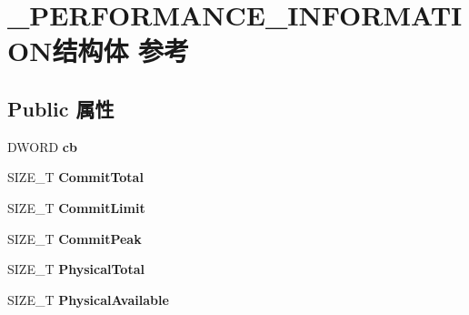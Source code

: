 \hypertarget{struct___p_e_r_f_o_r_m_a_n_c_e___i_n_f_o_r_m_a_t_i_o_n}{}\section{\+\_\+\+P\+E\+R\+F\+O\+R\+M\+A\+N\+C\+E\+\_\+\+I\+N\+F\+O\+R\+M\+A\+T\+I\+O\+N结构体 参考}
\label{struct___p_e_r_f_o_r_m_a_n_c_e___i_n_f_o_r_m_a_t_i_o_n}
\subsection*{Public 属性}
\begin{DoxyCompactItemize}
\item 
\mbox{\label{struct___p_e_r_f_o_r_m_a_n_c_e___i_n_f_o_r_m_a_t_i_o_n_a6cc44ea0397d9eefedb0f02ac1a9c631}} 
D\+W\+O\+RD {\bfseries cb}
\item 
\mbox{\label{struct___p_e_r_f_o_r_m_a_n_c_e___i_n_f_o_r_m_a_t_i_o_n_ad7b374092f82f4dd64cbbbabeb53b275}} 
S\+I\+Z\+E\+\_\+T {\bfseries Commit\+Total}
\item 
\mbox{\label{struct___p_e_r_f_o_r_m_a_n_c_e___i_n_f_o_r_m_a_t_i_o_n_a9efce97f0eb0a243f80149c8a692f58d}} 
S\+I\+Z\+E\+\_\+T {\bfseries Commit\+Limit}
\item 
\mbox{\label{struct___p_e_r_f_o_r_m_a_n_c_e___i_n_f_o_r_m_a_t_i_o_n_a37fd948fe5901ac8cdff4e95e67e4d2b}} 
S\+I\+Z\+E\+\_\+T {\bfseries Commit\+Peak}
\item 
\mbox{\label{struct___p_e_r_f_o_r_m_a_n_c_e___i_n_f_o_r_m_a_t_i_o_n_a73eafcf1d16b09c4dc4195f51124d579}} 
S\+I\+Z\+E\+\_\+T {\bfseries Physical\+Total}
\item 
\mbox{\label{struct___p_e_r_f_o_r_m_a_n_c_e___i_n_f_o_r_m_a_t_i_o_n_a35a7f39ad0acb8aa9f42affcfea3c08e}} 
S\+I\+Z\+E\+\_\+T {\bfseries Physical\+Available}
\item 

\end{DoxyCompactItemize}
